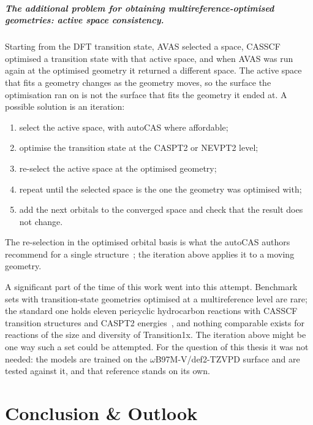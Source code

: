 \paragraph{The additional problem for obtaining multireference-optimised
geometries: active space consistency.} Starting from the DFT transition state, AVAS selected a
space, CASSCF optimised a transition state with that active space, and
when AVAS was run again at the optimised geometry it returned a
different space. The active space that
fits a geometry changes as the geometry moves, so the surface the
optimisation ran on is not the surface that fits the geometry it ended
at. A possible solution is an iteration:

\begin{enumerate}
  \item select the active space, with autoCAS where affordable;
  \item optimise the transition state at the CASPT2 or NEVPT2 level;
  \item re-select the active space at the optimised geometry;
  \item repeat until the selected space is the one the geometry was
    optimised with;
  \item add the next orbitals to the converged space and check that the
    result does not change.
\end{enumerate}

The re-selection in the optimised orbital basis is what the autoCAS
authors recommend for a single structure~\cite{stein2019autocas}; the
iteration above applies it to a moving geometry.

A significant part of the time of this work went into this attempt.
Benchmark sets with transition-state geometries optimised at a
multireference level are rare; the standard one holds eleven
pericyclic hydrocarbon reactions with CASSCF transition structures and
CASPT2 energies~\cite{guner2003}, and nothing comparable exists for
reactions of the size and diversity of Transition1x. The iteration
above might be one way such a set could be attempted. For the question
of this thesis it was not needed: the models are trained on the \mbox{$\omega$B97M-V/def2-TZVPD}
surface and are tested against it, and that reference stands on its
own.

\chapter{Conclusion \& Outlook}
\label{ch:conclusion}

